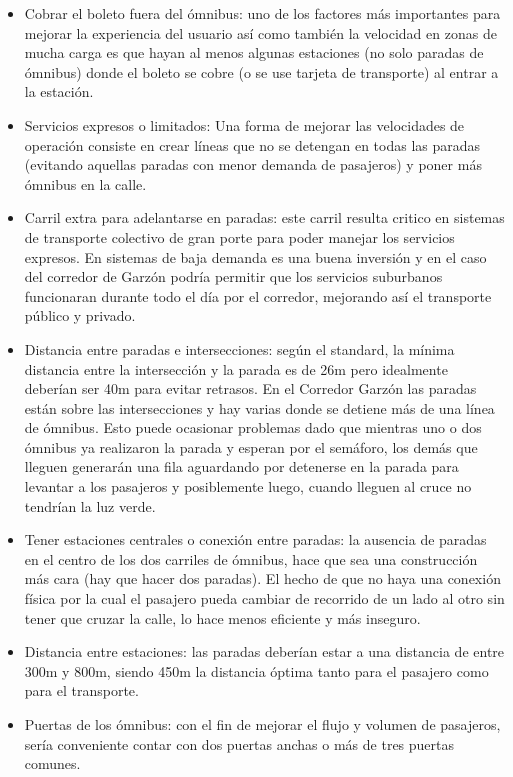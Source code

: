 \begin{itemize}
	\item Cobrar el boleto fuera del ómnibus: uno de los factores más importantes para mejorar la experiencia del usuario así como también la velocidad en zonas de mucha carga es que hayan al menos algunas estaciones (no solo paradas de ómnibus) donde el boleto se cobre (o se use tarjeta de transporte) al entrar a la estación.
	\item Servicios expresos o limitados: Una forma de mejorar las velocidades de operación consiste en crear líneas que no se detengan en todas las paradas (evitando aquellas paradas con menor demanda de pasajeros) y poner más ómnibus en la calle.
	\item Carril extra para adelantarse en paradas: este carril resulta critico en sistemas de transporte colectivo de gran porte para poder manejar los servicios expresos. En sistemas de baja demanda es una buena inversión y en el caso del corredor de Garzón podría permitir que los servicios suburbanos funcionaran durante todo el día por el corredor, mejorando así el transporte público y privado.
	\item Distancia entre paradas e intersecciones: según el standard, la mínima distancia entre la intersección y la parada es de 26m pero idealmente deberían ser 40m para evitar retrasos. En el Corredor Garzón las paradas están sobre las intersecciones y hay varias donde se detiene más de una línea de ómnibus. Esto puede ocasionar problemas dado que mientras uno o dos ómnibus ya realizaron la parada y esperan por el semáforo, los demás que lleguen generarán una fila aguardando por detenerse en la parada para levantar a los pasajeros y posiblemente luego, cuando lleguen al cruce no tendrían la luz verde.
	\item Tener estaciones centrales o conexión entre paradas: la ausencia de paradas en el centro de los dos carriles de ómnibus, hace que sea una construcción más cara (hay que hacer dos paradas). El hecho de que no haya una conexión física por la cual el pasajero pueda cambiar de recorrido de un lado al otro sin tener que cruzar la calle, lo hace menos eficiente y más inseguro.
	\item Distancia entre estaciones:  las paradas deberían estar a una distancia de entre 300m y 800m, siendo 450m la distancia óptima tanto para el pasajero como para el transporte.
	\item Puertas de los ómnibus: con el fin de mejorar el flujo y volumen de pasajeros, sería conveniente contar con dos puertas anchas o más de tres puertas comunes.

\end{itemize}
